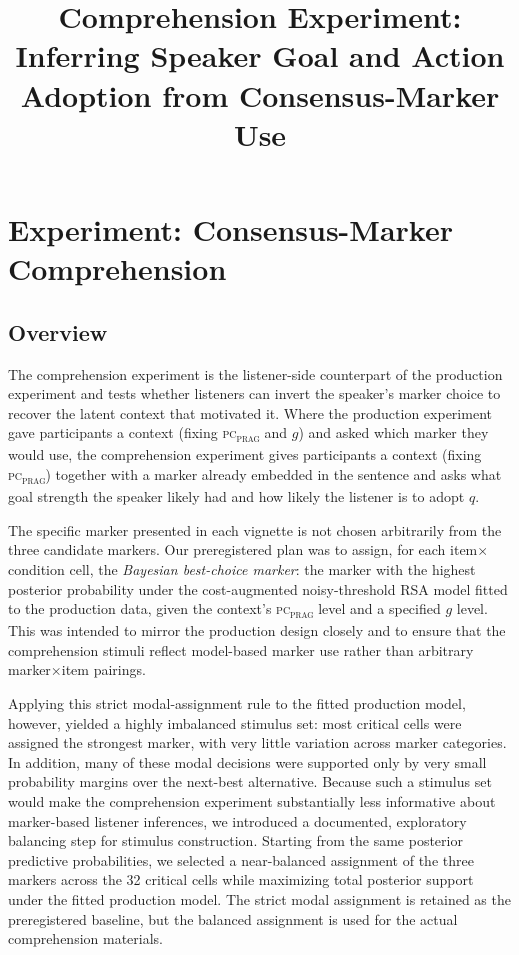 \documentclass[12pt]{article}
\title{Comprehension Experiment: Inferring Speaker Goal and Action Adoption
       from Consensus-Marker Use}
\author{}
\date{}
\begin{document}

\section{Experiment: Consensus-Marker Comprehension}

\subsection{Overview}

The comprehension experiment is the listener-side counterpart of the
production experiment and tests whether listeners can invert the
speaker's marker choice to recover the latent context that motivated it.
Where the production experiment gave participants a context (fixing
\textsc{pc\textsubscript{prag}} and $g$) and asked which marker they
would use, the comprehension experiment gives participants a context
(fixing \textsc{pc\textsubscript{prag}}) together with a marker already
embedded in the sentence and asks what goal strength the speaker likely
had and how likely the listener is to adopt $q$.

The specific marker presented in each vignette is not chosen arbitrarily
from the three candidate markers. Our preregistered plan was to assign,
for each item$\times$condition cell, the \emph{Bayesian best-choice marker}:
the marker with the highest posterior probability under the cost-augmented
noisy-threshold RSA model fitted to the production data, given the context's
\textsc{pc\textsubscript{prag}} level and a specified $g$ level. This was
intended to mirror the production design closely and to ensure that the
comprehension stimuli reflect model-based marker use rather than arbitrary
marker$\times$item pairings.

Applying this strict modal-assignment rule to the fitted production model,
however, yielded a highly imbalanced stimulus set: most critical cells were
assigned the strongest marker, with very little variation across marker
categories. In addition, many of these modal decisions were supported only by
very small probability margins over the next-best alternative. Because such a
stimulus set would make the comprehension experiment substantially less
informative about marker-based listener inferences, we introduced a documented,
exploratory balancing step for stimulus construction. Starting from the same
posterior predictive probabilities, we selected a near-balanced assignment of
the three markers across the 32 critical cells while maximizing total posterior
support under the fitted production model. The strict modal assignment is
retained as the preregistered baseline, but the balanced assignment is used for
the actual comprehension materials.
\end{document}
